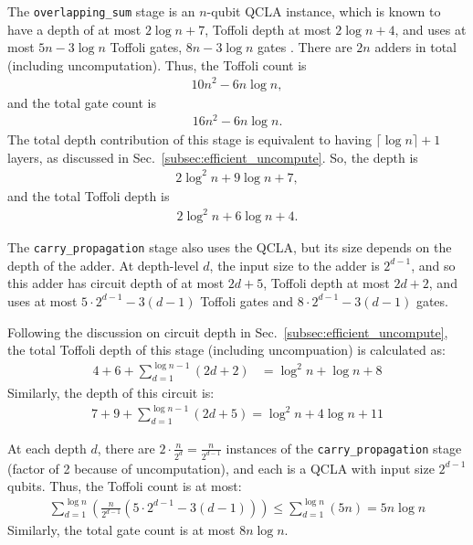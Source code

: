 \documentclass[reprint,amsmath,amssymb,aps,pra]{revtex4-2}
\begin{document}
The \texttt{overlapping\_sum} stage is an $n$-qubit QCLA instance, which is known to have a depth of at most $2\log{n}+7$, Toffoli depth at most $2\log{n}+4$, and uses at most $5n-3\log{n}$ Toffoli gates, $8n-3\log{n}$ gates \cite{Draper2004}. There are $2n$ adders in total (including uncomputation). Thus, the Toffoli count is 
\begin{align}10n^2-6n\log{n},\end{align}
and the total gate count is 
\begin{align}16n^2-6n\log{n}.\end{align}
The total depth contribution of this stage is equivalent to having $\lceil\log{n}\rceil+1$ layers, as discussed in Sec.~\ref{subsec:efficient_uncompute}. So, the depth is 
\begin{align}
    2\log^2{n}+9\log{n}+7,
\end{align}
and the total Toffoli depth is
\begin{align}
    2\log^2{n}+6\log{n}+4.
\end{align}


The \texttt{carry\_propagation} stage also uses the QCLA, but its size depends on the depth of the adder. At depth-level $d$, the input size to the adder is $2^{d-1}$, and so this adder has circuit depth of at most $2d+5$, Toffoli depth at most $2d+2$, and uses at most $5\cdot2^{d-1}-3(d-1)$ Toffoli gates and $8\cdot2^{d-1}-3(d-1)$ gates.


Following the discussion on circuit depth in Sec.~\ref{subsec:efficient_uncompute}, the total Toffoli depth of this stage (including uncompuation) is calculated as:
\begin{align}
    4+6+\sum_{d=1}^{\log{n}-1}(2d+2) &= \log^2{n}+\log{n} +8
\end{align}
Similarly, the depth of this circuit is:
\begin{align}
 7+9+\sum_{d=1}^{\log{n}-1}(2d+5)
    = \log^2{n} + 4\log{n}+11
\end{align}

At each depth $d$, there are $2\cdot \frac{n}{2^{d}} = \frac{n}{2^{d-1}}$ instances of the \texttt{carry\_propagation} stage (factor of 2 because of uncomputation), and each is a QCLA with input size $2^{d-1}$ qubits. Thus, the Toffoli count is at most:
\begin{align}
\sum_{d=1}^{\log{n}}(\frac{n}{2^{d-1}}(5\cdot2^{d-1}-3(d-1)))
    \leq\sum_{d=1}^{\log{n}}(5n) = 5n\log{n}
\end{align}
Similarly, the total gate count is at most $8n\log{n}$.
\end{document}
